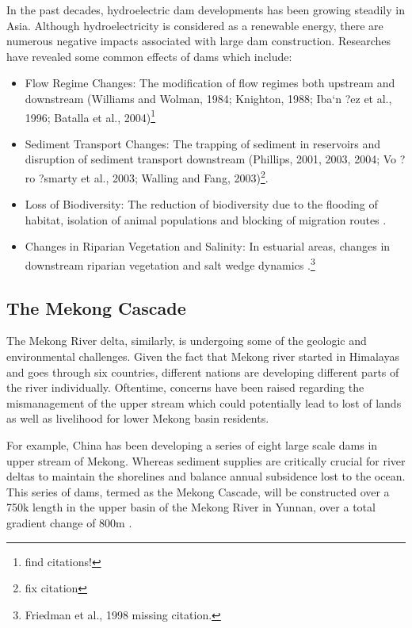   In the past decades, hydroelectric dam developments has been growing steadily in Asia. Although hydroelectricity is considered as a renewable energy, there are numerous negative impacts associated with large dam construction. Researches have revealed some common effects of dams which include:
  
\begin{itemize}
	\item Flow Regime Changes: The modification of flow regimes both upstream and downstream (Williams and Wolman, 1984; Knighton, 1988; Iba`n ?ez et al., 1996; Batalla et al., 2004)\footnote{find citations!}
	
	\item Sediment Transport Changes: The trapping of sediment in reservoirs and disruption of sediment transport downstream (Phillips, 2001, 2003, 2004; Vo ?ro ?smarty et al., 2003; Walling and Fang, 2003)\footnote{fix citation}. 
  
	\item Loss of Biodiversity: The reduction of biodiversity due to the flooding of habitat, isolation of animal populations and blocking of migration routes \citep{gehrke1995river; kingsford2000ecological;bunn2002basic}.

	\item Changes in Riparian Vegetation and Salinity: In estuarial areas, changes in downstream riparian vegetation and salt wedge dynamics \citep{wolanski1996fine; allison1998historical}.\footnote{Friedman et al., 1998 missing citation.}
\end{itemize}

\subsection{The Mekong Cascade}

The Mekong River delta, similarly, is undergoing some of the geologic and environmental challenges. Given the fact that Mekong river started in Himalayas and goes through six countries, different nations are developing different parts of the river individually. Oftentime, concerns have been raised regarding the mismanagement of the upper stream which could potentially lead to lost of lands as well as livelihood for lower Mekong basin residents. 

For example, China has been developing a series of eight large scale dams in upper stream of Mekong. Whereas sediment supplies are critically crucial for river deltas to maintain the shorelines and balance annual subsidence lost to the ocean. This series of dams, termed as the Mekong Cascade, will be constructed over a 750k length in the upper basin of the Mekong River in Yunnan, over a total gradient change of 800m \citep{plinston1999water}. 

